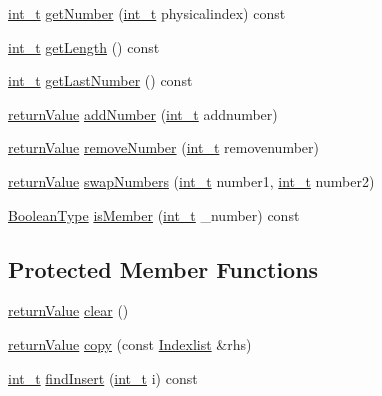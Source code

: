 \begin{DoxyCompactItemize}
\item 
\hyperlink{_types_8hpp_ab6fd6105e64ed14a0c9281326f05e623}{int\+\_\+t} \hyperlink{class_indexlist_a235bdb572a10884ec08b99be0fcc235a}{get\+Number} (\hyperlink{_types_8hpp_ab6fd6105e64ed14a0c9281326f05e623}{int\+\_\+t} physicalindex) const
\item 
\hyperlink{_types_8hpp_ab6fd6105e64ed14a0c9281326f05e623}{int\+\_\+t} \hyperlink{class_indexlist_a2655f6990ec0500c482c1ca78ec853fa}{get\+Length} () const
\item 
\hyperlink{_types_8hpp_ab6fd6105e64ed14a0c9281326f05e623}{int\+\_\+t} \hyperlink{class_indexlist_ade762938b1843833510ab86f2bcd73cf}{get\+Last\+Number} () const
\item 
\hyperlink{_message_handling_8hpp_a81d556f613bfbabd0b1f9488c0fa865e}{return\+Value} \hyperlink{class_indexlist_a6774029ad3f8b1a1f9b2dd33fea9fcf8}{add\+Number} (\hyperlink{_types_8hpp_ab6fd6105e64ed14a0c9281326f05e623}{int\+\_\+t} addnumber)
\item 
\hyperlink{_message_handling_8hpp_a81d556f613bfbabd0b1f9488c0fa865e}{return\+Value} \hyperlink{class_indexlist_a16777f1e0828b13243b32142f1f7a1ce}{remove\+Number} (\hyperlink{_types_8hpp_ab6fd6105e64ed14a0c9281326f05e623}{int\+\_\+t} removenumber)
\item 
\hyperlink{_message_handling_8hpp_a81d556f613bfbabd0b1f9488c0fa865e}{return\+Value} \hyperlink{class_indexlist_a8affe558d7e73de524978b9d153a17f4}{swap\+Numbers} (\hyperlink{_types_8hpp_ab6fd6105e64ed14a0c9281326f05e623}{int\+\_\+t} number1, \hyperlink{_types_8hpp_ab6fd6105e64ed14a0c9281326f05e623}{int\+\_\+t} number2)
\item 
\hyperlink{_types_8hpp_a20f82124c82b6f5686a7fce454ef9089}{Boolean\+Type} \hyperlink{class_indexlist_a83ec064b8e0dff5171d60324520cda88}{is\+Member} (\hyperlink{_types_8hpp_ab6fd6105e64ed14a0c9281326f05e623}{int\+\_\+t} \+\_\+number) const
\end{DoxyCompactItemize}
\subsection*{Protected Member Functions}
\begin{DoxyCompactItemize}
\item 
\hyperlink{_message_handling_8hpp_a81d556f613bfbabd0b1f9488c0fa865e}{return\+Value} \hyperlink{class_indexlist_a34e0b17923cc67a03f9aeb011261bb89}{clear} ()
\item 
\hyperlink{_message_handling_8hpp_a81d556f613bfbabd0b1f9488c0fa865e}{return\+Value} \hyperlink{class_indexlist_a9ffa9399d56190092586fe3f366aab87}{copy} (const \hyperlink{class_indexlist}{Indexlist} \&rhs)
\item 
\hyperlink{_types_8hpp_ab6fd6105e64ed14a0c9281326f05e623}{int\+\_\+t} \hyperlink{class_indexlist_a32388283a23256266616946d3c683ec7}{find\+Insert} (\hyperlink{_types_8hpp_ab6fd6105e64ed14a0c9281326f05e623}{int\+\_\+t} i) const
\end{DoxyCompactItemize}
